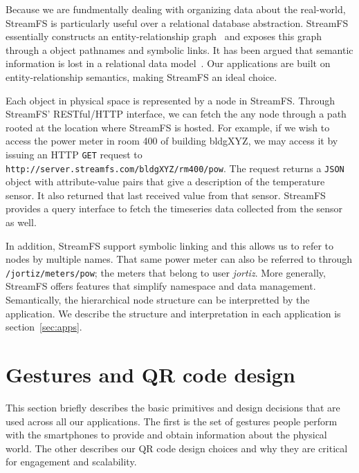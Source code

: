 Because we are fundmentally dealing with organizing data about the real-world, StreamFS is particularly useful over
a relational database abstraction.  StreamFS essentially constructs an entity-relationship graph~\cite{Chen76theentity-relationship}
and exposes this graph through a object pathnames and symbolic links.  It has been argued that semantic information
is lost in a relational data model~\cite{semanticmodel,semanticrelational}.  Our applications are built on
entity-relationship semantics, making StreamFS an ideal choice.

Each object in physical space is represented by a node in StreamFS.  Through StreamFS' RESTful/HTTP interface, we can
fetch the any node through a path rooted at the location where StreamFS is hosted.  For example, if we wish
to access the power meter in room 400 of building bldgXYZ, we may access it by issuing an HTTP {\tt GET} request to
{\tt http://server.streamfs.com/bldgXYZ/rm400/pow}.  The request returns a {\tt JSON} object with attribute-value
pairs that give a description of the temperature sensor.  It also returned that last received value from that sensor.
StreamFS provides a query interface to fetch the timeseries data collected from the sensor as well.

In addition, StreamFS support symbolic linking and this allows us to refer to nodes by multiple names.  That same 
power meter can also be referred to through {\tt /jortiz/meters/pow}; the meters that belong to user \emph{jortiz}.
More generally, StreamFS offers features that simplify namespace and data management.  Semantically, the hierarchical
node structure can be interpretted by the application.  We describe the structure and interpretation in
each application is section~\ref{sec:apps}.


\section{Gestures and QR code design}
This section briefly describes the basic primitives and design decisions that are used across all our applications.
The first is the set of gestures people perform with the smartphones to provide and obtain information about
the physical world.  The other describes our QR code design choices and why they are critical for engagement
and scalability.

